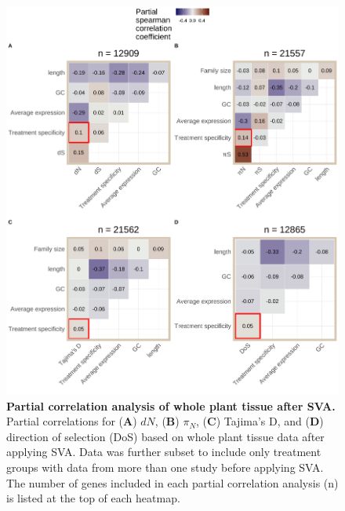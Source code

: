 \documentclass[12pt]{article}
\begin{document}
\begin{figure}[H]
\includegraphics[width=\linewidth, height=\textheight, keepaspectratio]{figures/appendix_a/partialCorrelations_withoutTissueSpecificityAfterSVA_wholePlant_2023-02-21.pdf}
\caption{\textbf{Partial correlation analysis of whole plant tissue after SVA.} Partial correlations for (\textbf{A}) $dN$, (\textbf{B}) $\pi_N$, (\textbf{C}) Tajima's D, and (\textbf{D}) direction of selection (DoS) based on whole plant tissue data after applying SVA. Data was further subset to include only treatment groups with data from more than one study before applying SVA. The number of genes included in each partial correlation analysis (n) is listed at the top of each heatmap.}%
\end{figure}

\newpage
\end{document}
